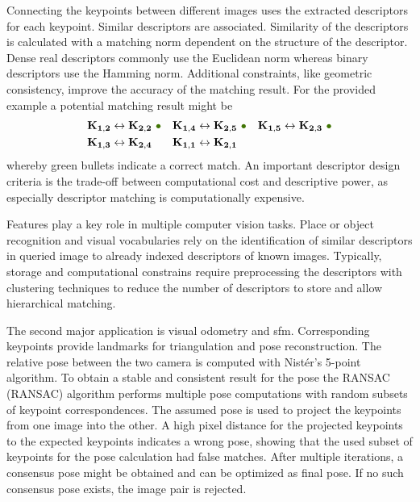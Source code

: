 Connecting the keypoints between different images uses the extracted descriptors for each keypoint.
Similar descriptors are associated.
Similarity of the descriptors is calculated with a matching norm dependent on the structure of the descriptor.
Dense real descriptors commonly use the Euclidean norm whereas binary descriptors use the Hamming norm.
Additional constraints, like geometric consistency, improve the accuracy of the matching result.
For the provided example a potential matching result might be
\begin{equation}
\begin{aligned}
    \mathbf{K_{1,2}} &\leftrightarrow \mathbf{K_{2,2}}~\textcolor{darkgreen}{\bullet} &
    \mathbf{K_{1,4}} &\leftrightarrow \mathbf{K_{2,5}}~\textcolor{darkgreen}{\bullet} &
    \mathbf{K_{1,5}} &\leftrightarrow \mathbf{K_{2,3}}~\textcolor{darkgreen}{\bullet} \\
    \mathbf{K_{1,3}} &\leftrightarrow \mathbf{K_{2,4}} &
    \mathbf{K_{1,1}} &\leftrightarrow \mathbf{K_{2,1}} &
\end{aligned}
\end{equation}
whereby green bullets indicate a correct match.
An important descriptor design criteria is the trade-off between computational cost and descriptive power, as especially descriptor matching is computationally expensive.

Features play a key role in multiple computer vision tasks.
Place or object recognition and visual vocabularies rely on the identification of similar descriptors in queried image to already indexed descriptors of known images.
Typically, storage and computational constrains require preprocessing the descriptors with clustering techniques to reduce the number of descriptors to store and allow hierarchical matching.

The second major application is visual odometry and \gls{sfm}.
Corresponding keypoints provide landmarks for triangulation and pose reconstruction.
The relative pose between the two camera is computed with Nistér's 5-point algorithm\cite{nister_ieee2004}.
To obtain a stable and consistent result for the pose the \acrshort{RANSAC} (\acrlong{RANSAC})\cite{fischler_ransac_1980} algorithm performs multiple pose computations with random subsets of keypoint correspondences.
The assumed pose is used to project the keypoints from one image into the other.
A high pixel distance for the projected keypoints to the expected keypoints indicates a wrong pose, showing that the used subset of keypoints for the pose calculation had false matches.
After multiple iterations, a consensus pose might be obtained and can be optimized as final pose.
If no such consensus pose exists, the image pair is rejected.

